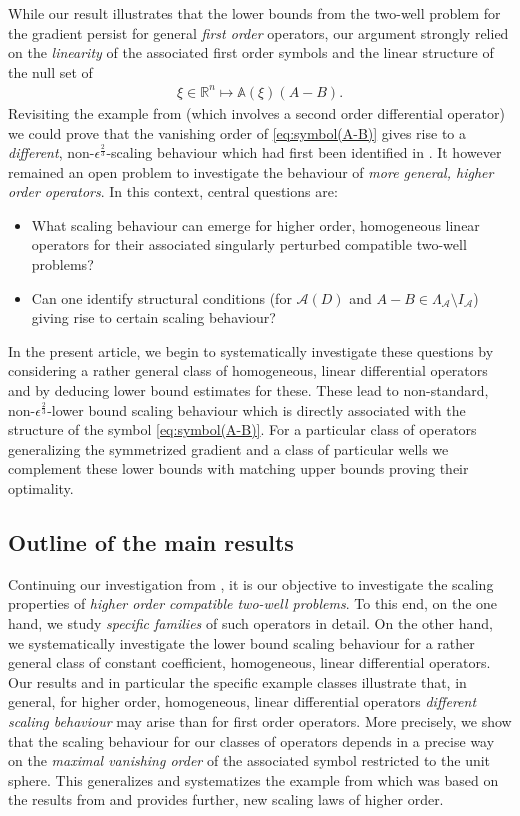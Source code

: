 \documentclass[a4paper, 10pt, twoside, notitlepage]{amsart}
\theoremstyle{plain}
\newcommand{\R}{\mathbb{R}}
\newcommand{\A}{\mathcal{A}}
\renewcommand{\AA}{\mathbb{A}}
\begin{document}
	
	While our result illustrates that the lower bounds from the two-well problem for the gradient persist for general \emph{first order} operators, our argument strongly relied on the \emph{linearity} of the associated first order symbols and the linear structure of the null set of
	\begin{align}\label{eq:symbol(A-B)}
		\xi\in\R^n\mapsto \AA(\xi)(A-B).
	\end{align}
	 Revisiting the example from \cite{CC15} (which involves a second order differential operator) we could prove
	that the vanishing order of \eqref{eq:symbol(A-B)} gives rise to a \emph{different}, non-$\epsilon^{\frac{2}{3}}$-scaling behaviour which had first been identified in \cite{CC15}.  It however remained
	an open problem to investigate the behaviour of \emph{more general, higher order operators}.  In this context, central questions are:
	\begin{itemize}
		\item[(Q1)] What scaling behaviour can emerge for higher order, homogeneous linear operators for their associated singularly perturbed compatible two-well problems?
		\item[(Q2)] Can one identify structural conditions (for $\A(D)$ and $A-B \in \Lambda_{\A}\setminus I_{\A}$) giving rise to certain scaling behaviour?
	\end{itemize}
	In the present article, we begin to systematically investigate these questions by considering a rather general class of homogeneous, linear differential operators and by deducing lower bound
	estimates for these.  These lead to non-standard, non-$\epsilon^{\frac{2}{3}}$-lower bound scaling behaviour which is directly associated with the structure of the symbol \eqref{eq:symbol(A-B)}. For a particular class of operators generalizing the symmetrized gradient and a class of particular wells we complement these
	lower bounds with matching upper bounds proving their optimality.
	
	
	\subsection{Outline of the main results}
	\label{sec:main}
	Continuing our investigation from \cite{RRT22}, it is our objective to investigate the scaling properties of \emph{higher order compatible two-well problems}. To this end, on the one hand, we
	study \emph{specific families} of such operators in detail. On the other hand, we systematically investigate the lower bound scaling behaviour for a rather general class of constant coefficient,
	homogeneous, linear differential operators.  Our results and in particular the specific example classes illustrate that, in general, for higher order, homogeneous, linear differential
	operators \emph{different scaling behaviour} may arise than for first order operators. More precisely, we show that the scaling behaviour for our classes of operators depends in a precise way
	on the \emph{maximal vanishing order} of the associated symbol restricted to the unit sphere. This generalizes and systematizes the example from \cite[Section 3.5]{RRT22} which was based on the results from \cite{CC15} and provides
	further, new scaling laws of higher order.
	
\end{document}
